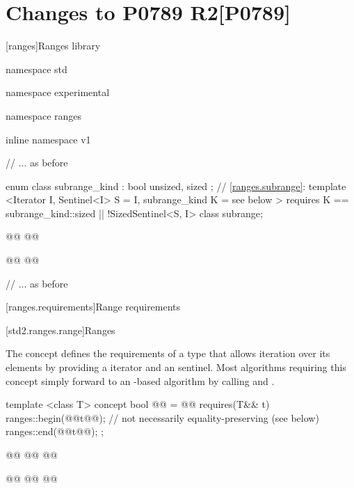 
\part[Changes to P0789 R2]{Changes to P0789 R2\hfill[P0789]}\label{P0789}

\setcounter{chapter}{9}
[ranges]{Ranges library}



\begin{codeblock}
namespace std { namespace experimental { namespace ranges { inline namespace v1 {
  // ... as before

  enum class subrange_kind : bool { unsized, sized };
  // \ref{ranges.subrange}:
  template <Iterator I, Sentinel<I> S = I, subrange_kind K = see below >
      requires K == subrange_kind::sized || !SizedSentinel<S, I>
  class subrange;

  @@
    @@

  @@
    @@

  // ... as before
}}}}
\end{codeblock}

\setcounter{section}{5}
[ranges.requirements]{Range requirements}

\setcounter{subsection}{1}
[std2.ranges.range]{Ranges}

\pnum
The  concept defines the requirements of a type that allows
iteration over its elements by providing a  iterator and an
 sentinel.
\enternote Most algorithms requiring this concept simply forward to an
-based algorithm by calling  and . \exitnote

\begin{itemdecl}
template <class T>
concept bool @@ = @\added{// \expos}@
  requires(T&& t) {
    ranges::begin(@@t@\added{)}@); // not necessarily equality-preserving (see below)
    ranges::end(@@t@\added{)}@);
  };

@@
@@
  @@

@@
@@
  @@
\end{itemdecl}

